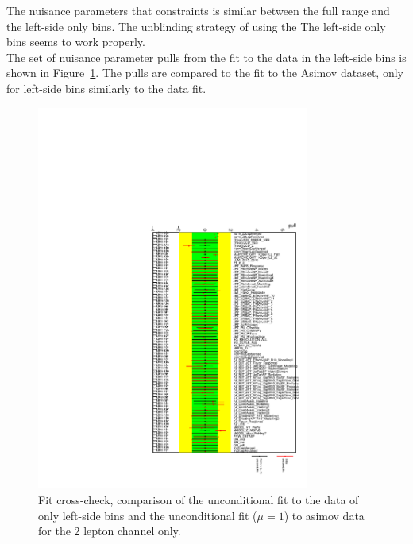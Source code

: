 The nuisance parameters that constraints is similar between the full range and the left-side only bins. The unblinding strategy of using the The left-side only bins seems to work properly.\\

The set of nuisance parameter pulls from the fit to the data in the left-side bins is shown in Figure~\ref{fig:fit_2lep_pull}. The pulls are compared to the fit to the Asimov dataset, only for left-side bins similarly to the data fit. 
\begin{figure}[ht]
      \centering
        \includegraphics[width=0.8\textwidth]{figures/2lep/FitResults/fit_2lep_pull.pdf}
        \caption{Fit cross-check, comparison of the unconditional fit to the data of only left-side bins and the unconditional fit ($\mu=1$) to asimov data for the 2 lepton channel only.}
       \label{fig:fit_2lep_pull}
\end{figure}

